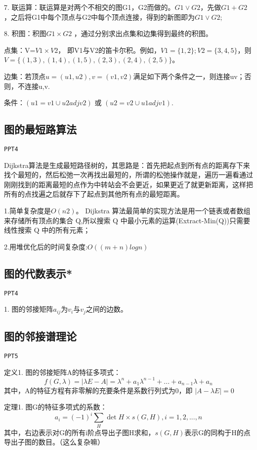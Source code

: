 \documentclass{article}
\begin{document}
7. 联运算：联运算是对两个不相交的图G1，G2而做的。$G1 \vee G2$，先做$G1+G2$，之后将G1中每个顶点与G2中每个顶点连接，得到的新图即为$G1 \vee G2$;

8. 积图：积图$G1 \times G2$ ，通过分别求出点集和边集得到最终的积图。

点集：V=$V1 \times V2$， 即V1与V2的笛卡尔积。例如，$V1=\{1,2\};V2=\{3,4,5\}$，则$V=\{(1,3),(1,4),(1,5),(2,3),(2,4),(2,5)\}$。

边集：若顶点$u=(u1,u2),v=(v1,v2)$满足如下两个条件之一，则连接uv；否则，不连接u,v.

条件：$(u1=v1 \cup u2 adj v2)$ 或 $(u2=v2 \cup u1 adj v1)$.

\subsection{图的最短路算法}

\texttt{PPT4}

Dijkstra算法是生成最短路径树的，其思路是：首先把起点到所有点的距离存下来找个最短的，然后松弛一次再找出最短的，所谓的松弛操作就是，遍历一遍看通过刚刚找到的距离最短的点作为中转站会不会更近，如果更近了就更新距离，这样把所有的点找遍之后就存下了起点到其他所有点的最短距离。

1.简单复杂度是$O(n2)$。 Dijkstra 算法最简单的实现方法是用一个链表或者数组来存储所有顶点的集合 Q,所以搜索 Q 中最小元素的运算(Extract-Min(Q))只需要线性搜索 Q 中的所有元素；

2.用堆优化后的时间复杂度:$O((m+n)log n)$

\subsection{图的代数表示*}

\texttt{PPT4}

1. 图的邻接矩阵$a_{ij}$为$v_i$与$v_j$之间的边数。

\subsection{图的邻接谱理论}

\texttt{PPT5}

定义1. 图的邻接矩阵A的特征多项式：$$f(G,\lambda) = |\lambda E - A| = \lambda^n + a_1 \lambda^{n-1} + ... + a_{n-1} \lambda + a_n $$ 其中，A的特征方程有非零解的充要条件是系数行列式为0，即 $| A - \lambda E | = 0$

定理1. 图G的特征多项式的系数：$$a_i = (-1)^i \sum_H \det H \times s(G,H), i = 1,2,...,n$$其中，右边表示对G的所有i阶点导出子图H求和，$s(G,H)$表示G的同构于H的点导出子图的数目。（这么复杂嘛）
\end{document}
